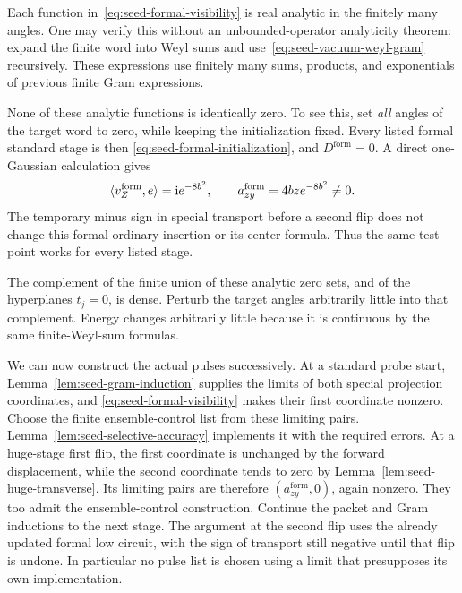 Each function in~\eqref{eq:seed-formal-visibility} is real analytic in
the finitely many angles.  One may verify this without an
unbounded-operator analyticity theorem: expand the finite word into
Weyl sums and use~\eqref{eq:seed-vacuum-weyl-gram} recursively.  These
expressions use finitely many sums, products, and exponentials of
previous finite Gram expressions.

None of these analytic functions is identically zero.  To see this,
set \emph{all} angles of the target word to zero, while keeping the
initialization fixed.  Every listed formal standard stage is then
\eqref{eq:seed-formal-initialization}, and
\(D^{\mathrm{form}}=0\).  A direct one-Gaussian calculation gives
\[
 \langle v_Z^{\mathrm{form}},e\rangle
 =\mathrm i e^{-8b^2},\qquad
 a_{zy}^{\mathrm{form}}=4bz e^{-8b^2}\neq0.
\]
The temporary minus sign in special transport before a second flip
does not change this formal ordinary insertion or its center formula.
Thus the same test point works for every listed stage.

The complement of the finite union of these analytic zero sets, and
of the hyperplanes \(t_j=0\), is dense.  Perturb the target angles
arbitrarily little into that complement.  Energy changes arbitrarily
little because it is continuous by the same finite-Weyl-sum formulas.

We can now construct the actual pulses successively.  At a standard
probe start, Lemma~\ref{lem:seed-gram-induction} supplies the limits of
both special projection coordinates, and
\eqref{eq:seed-formal-visibility} makes their first coordinate nonzero.
Choose the finite ensemble-control list from these limiting pairs.
Lemma~\ref{lem:seed-selective-accuracy} implements it with the required
errors.  At a huge-stage first flip, the first coordinate is unchanged
by the forward displacement, while the second coordinate tends to zero
by Lemma~\ref{lem:seed-huge-transverse}.  Its limiting pairs are
therefore \((a_{zy}^{\mathrm{form}},0)\), again nonzero.  They too
admit the ensemble-control construction.  Continue the packet and Gram
inductions to the next stage.  The argument at the second flip uses the
already updated formal low circuit, with the sign of transport still
negative until that flip is undone.  In particular no pulse list is
chosen using a limit that presupposes its own implementation.

